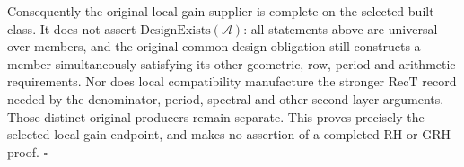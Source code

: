 \documentclass[11pt,a4paper]{article}
\numberwithin{equation}{section}
\theoremstyle{remark}\newtheorem{remark}[theorem]{Remark}
\begin{document}
Consequently the original local-gain supplier is complete on the
selected built class.  It does not assert
\(\mathrm{DesignExists}(\mathcal A)\): all statements above are
universal over members, and the original common-design obligation
still constructs a member simultaneously satisfying its other
geometric, row, period and arithmetic requirements.  Nor does
local compatibility manufacture the stronger \(\mathrm{RecT}\)
record needed by the denominator, period, spectral and other
second-layer arguments.  Those distinct original producers remain
separate.  This proves precisely the selected local-gain endpoint,
and makes no assertion of a completed RH or GRH proof.
\hfill\(\square\)

\endgroup
\end{document}
